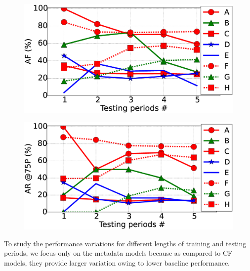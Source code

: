 \begin{figure}
\centering
\begin{minipage}{.48\textwidth}
  \centering
  \includegraphics[width=0.95\linewidth]{FileAccess/figs/VaryTestFScore10}
  \label{fig:varytestFscore}
\end{minipage} %
\begin{minipage}{.48\textwidth}
  \centering
  \includegraphics[width=0.95\linewidth]{FileAccess/figs/VaryTestR7510}
  \label{fig:varytestR75}
\end{minipage}
\end{figure}
To study the performance variations for different lengths of training
and testing periods, we focus only on the metadata models because as
compared to CF models, they provide larger variation owing to lower
baseline performance.


